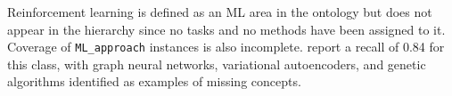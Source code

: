 Reinforcement learning is defined as an ML area in the
ontology but does not appear in the hierarchy since no tasks
and no methods have been assigned to it.
Coverage of \texttt{ML\_approach} instances is also
incomplete. \textcite{humm2026industry_ready_machine_learning_ontology}
report a recall of 0.84 for this class, with graph neural
networks, variational autoencoders, and genetic algorithms
identified as examples of missing concepts.